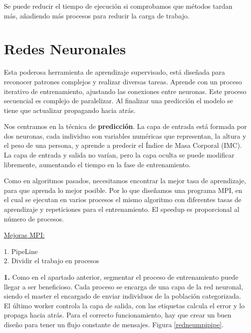 	Se puede reducir el tiempo de ejecución si comprobamos que métodos tardan más, añadiendo más procesos para reducir la carga de trabajo.
	
	
	
	
	


\section{Redes Neuronales}
	Esta poderosa herramienta de aprendizaje supervisado, está diseñada para reconocer patrones complejos y realizar diversas tareas. Aprende con un proceso iterativo de entrenamiento, ajustando las conexiones entre neuronas. Este proceso secuencial es complejo de paralelizar. Al finalizar una predicción el modelo se tiene que actualizar propagando hacia atrás.
	
	Nos centramos en la técnica de \textbf{predicción}. La capa de entrada está formada por dos neuronas, cada individuo son variables numéricas que representan, la altura y el peso de una persona, y aprende a predecir el Índice de Masa Corporal (IMC). La capa de entrada y salida no varían, pero la capa oculta se puede modificar libremente, aumentando el tiempo en la fase de entrenamiento.
	
	
	Como en algoritmos pasados, necesitamos encontrar la mejor tasa de aprendizaje, para que aprenda lo mejor posible. Por lo que diseñamos una programa MPI, en el cual se ejecutan en varios procesos el mismo algoritmo con diferentes tasas de aprendizaje y repeticiones para el entrenamiento. El speedup es proporcional al número de procesos.
	
	\underline{Mejoras MPI:}
	
	1. PipeLine\\
	2. Dividir el trabajo en procesos
	
	\textbf{1. }Como en el apartado anterior, segmentar el proceso de entrenamiento puede llegar a ser beneficioso. Cada proceso se encarga de una capa de la red neuronal, siendo el master el encargado de enviar individuos de la población categorizada. El último worker controla la capa de salida, con las etiquetas calcula el error y lo propaga hacia atrás. Para el correcto funcionamiento, hay que crear un buen diseño para tener un flujo constante de mensajes. Figura \ref{redneumpipipe}.
	
